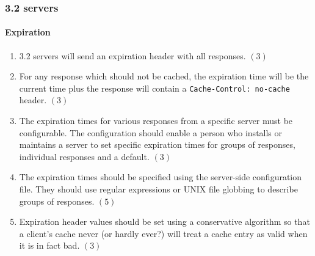 \documentclass{article}
\begin{document}
\subsubsection{3.2 servers}
\paragraph{Expiration}
\begin{enumerate}
\item 3.2 servers will send an expiration header with all responses. $(3)$
\item For any response which should not be cached, the expiration time will
  be the current time plus the response will contain a \texttt{Cache-Control:
    no-cache} header. $(3)$
\item The expiration times for various responses from a specific server must
  be configurable. The configuration should enable a person who installs or
  maintains a server to set specific expiration times for groups of
  responses, individual responses and a default. $(3)$
\item The expiration times should be specified using the server-side
  configuration file. They should use regular expressions or UNIX file
  globbing to describe groups of responses. $(5)$
\item Expiration header values should be set using a conservative algorithm
  so that a client's cache never (or hardly ever?) will treat a cache entry
  as valid when it is in fact bad. $(3)$
\end{enumerate}
\end{document}
